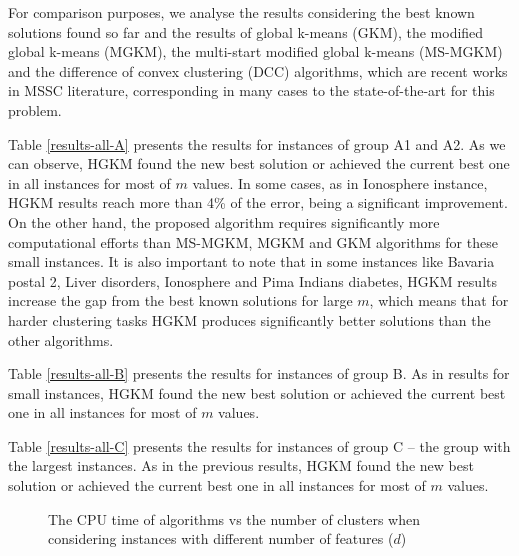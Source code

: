 For comparison purposes, we analyse the results considering the best known solutions found so far and the results of global k-means (GKM), the modified global k-means (MGKM), the multi-start modified global k-means (MS-MGKM) and the difference of convex clustering (DCC) algorithms, which are recent works in MSSC literature, corresponding in many cases to the state-of-the-art for this problem.







Table \ref{results-all-A} presents the results for instances of group A1 and A2. As we can observe, HGKM found the new best solution or achieved the current best one in all instances for most of $m$ values. In some cases, as in Ionosphere instance, HGKM results reach more than 4\% of the error, being a significant improvement. On the other hand, the proposed algorithm requires significantly more computational efforts than MS-MGKM, MGKM and GKM algorithms for these small instances. It is also important to note that in some instances like Bavaria postal 2, Liver disorders, Ionosphere and Pima Indians diabetes, HGKM results increase the gap from the best known solutions for large $m$, which means that for harder clustering tasks HGKM produces significantly better solutions than the other algorithms.

Table \ref{results-all-B} presents the results for instances of group B. As in results for small instances, HGKM found the new best solution or achieved the current best one in all instances for most of $m$ values.

Table \ref{results-all-C} presents the results for instances of group C -- the group with the largest instances. As in the previous results, HGKM found the new best solution or achieved the current best one in all instances for most of $m$ values.




\begin{figure}[h!]
\centering
{}
\caption{The CPU time of algorithms vs the number of clusters when considering instances with different number of features ($d$)}
\end{figure}


